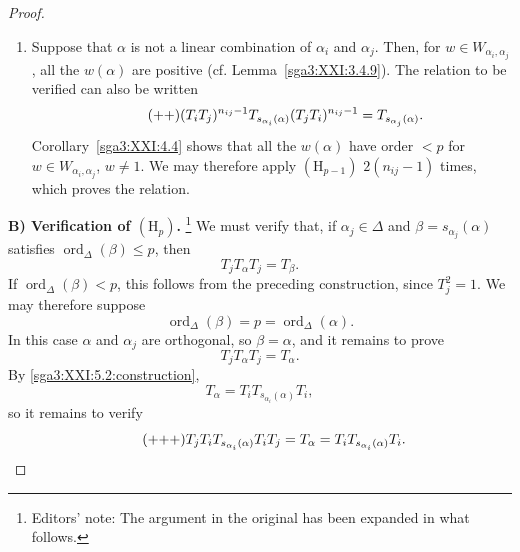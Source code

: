 \begin{proof}
\begin{enumerate}
\item[(2)] Suppose that \(\alpha\) is not a linear combination of
\(\alpha_i\) and \(\alpha_j\). Then, for
\(w\in W_{\alpha_i,\alpha_j}\), all the \(w(\alpha)\) are positive
(cf. Lemma~\ref{sga3:XXI:3.4.9}). The relation to be verified can
also be written
\begin{equation}
\tag{\({+}{+}\)}
\label{sga3:XXI:5.2:rank-two-relation}
 (T_iT_j)^{n_{ij}-1}T_{s_{\alpha_i}(\alpha)}
 (T_jT_i)^{n_{ij}-1}
 =T_{s_{\alpha_j}(\alpha)}.
\end{equation}
Corollary~\ref{sga3:XXI:4.4} shows that all the \(w(\alpha)\) have
order \(<p\) for
\(w\in W_{\alpha_i,\alpha_j}\), \(w\ne1\). We may therefore apply
\((\mathrm{H}_{p-1})\) \(2(n_{ij}-1)\) times, which proves the
relation.
\end{enumerate}

\medskip
\noindent\textbf{B) Verification of \((\mathrm{H}_p)\).}
\footnote{Editors' note: The argument in the original has been
expanded in what follows.}
We must verify that, if \(\alpha_j\in\Delta\) and
\(\beta=s_{\alpha_j}(\alpha)\) satisfies
\(\operatorname{ord}_\Delta(\beta)\le p\), then
\[
 T_jT_\alpha T_j=T_\beta.
\]
If \(\operatorname{ord}_\Delta(\beta)<p\), this follows from the
preceding construction, since \(T_j^2=1\). We may therefore suppose
\[
 \operatorname{ord}_\Delta(\beta)
 =p=\operatorname{ord}_\Delta(\alpha).
\]
In this case \(\alpha\) and \(\alpha_j\) are orthogonal, so
\(\beta=\alpha\), and it remains to prove
\begin{equation}
\tag{\(\dagger\)}
\label{sga3:XXI:5.2:orthogonal}
 T_jT_\alpha T_j=T_\alpha.
\end{equation}
By \eqref{sga3:XXI:5.2:construction},
\[
 T_\alpha=T_iT_{s_{\alpha_i}(\alpha)}T_i,
\]
so it remains to verify
\begin{equation}
\tag{\({+}{+}{+}\)}
\label{sga3:XXI:5.2:orthogonal-expanded}
 T_jT_iT_{s_{\alpha_i}(\alpha)}T_iT_j
 =T_\alpha
 =T_iT_{s_{\alpha_i}(\alpha)}T_i.
\end{equation}
\end{proof}


